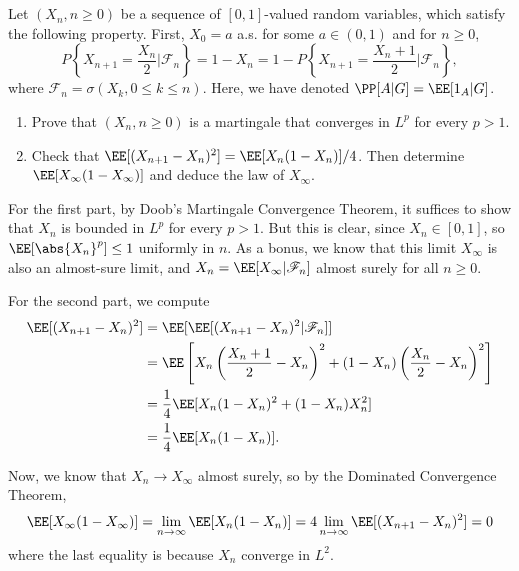 \documentclass[11pt, headheight=30pt]{scrartcl}
\begin{document}
\section{}
\begin{prob*}
    Let $(X_n, n \geq 0)$ be a sequence of $[0, 1]$-valued random variables, which satisfy
    the following property. First, $X_0 = a$ a.s. for some $a \in (0, 1)$ and for $n \geq 0$,
    \[
        P
        \left\{
            X_{n+1} = \frac{X_n}{2} \bigg| \mathscr{F}_n
        \right\}
        = 1 - X_n = 1 - P
        \left\{
            X_{n+1} = \frac{X_n + 1}{2} \bigg| \mathscr{F}_n
        \right\},
    \]
    where $\mathscr{F}_n = \sigma(X_k, 0 \leq k \leq n)$. Here, we have denoted $\PP[A | G] = \EE[1_A | G]$.
    \begin{enumerate}
        \item Prove that $(X_n, n \geq 0)$ is a martingale that converges in $L^p$ for every $p > 1$.
        \item Check that $\EE[(X_{n+1} - X_n)^2] = \EE[X_n(1 - X_n)]/4$. Then determine $\EE[X_\infty(1 - X_\infty)]$ and deduce
        the law of $X_\infty$.
    \end{enumerate}
\end{prob*}

For the first part, by Doob's Martingale Convergence Theorem, it suffices to show that
$X_n$ is bounded in $L^p$ for every $p > 1$. But this is clear, since $X_n \in [0, 1]$,
so $\EE[\abs{X_n}^p] \leq 1$ uniformly in $n$. As a bonus, we know that this limit $X_\infty$
is also an almost-sure limit, and $X_n = \EE[X_\infty | \mathscr{F}_n]$ almost surely for all $n\geq 0$.

For the second part, we compute
\begin{align*}
    \EE[(X_{n+1} - X_n)^2] &= \EE[ \EE[(X_{n+1} - X_n)^2 | \mathscr{F}_n]]\\
    &= \EE\left[X_n\left(\frac{X_n + 1}{2} - X_n\right)^2 + (1 - X_n)\left(\frac{X_n}{2} - X_n\right)^2\right]\\
    &= \frac14 \EE[X_n(1 - X_n)^2 + (1-X_n)X_n^2]\\
    &= \frac14 \EE[X_n(1 - X_n)].
\end{align*}

Now, we know that $X_n \to X_\infty$ almost surely,
so by the Dominated Convergence Theorem,
\[
    \EE[X_\infty(1 - X_\infty)] = \lim_{n\to \infty} \EE[X_n(1 - X_n)] = 4 \lim_{n\to \infty} \EE[(X_{n+1} - X_n)^2] = 0
\]
where the last equality is because $X_n$ converge in $L^2$.
\end{document}
